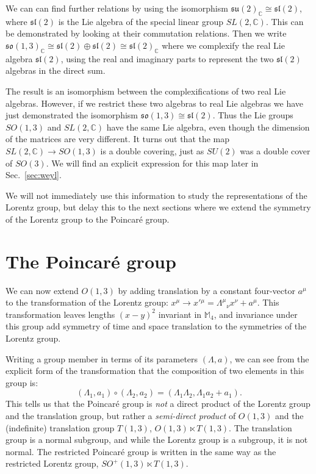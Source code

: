 \documentclass[notes.tex]{subfiles}
\begin{document}
We can can find further relations by using the isomorphism $\mathfrak{su}(2)_{\mathbb C}\cong \mathfrak{sl}(2)$, where $\mathfrak{sl}(2)$ is the Lie algebra of the special linear group $SL(2,\mathbb C)$. This can be demonstrated by looking at their commutation relations. Then we write
$\mathfrak{so}(1,3)_{\mathbb C}\cong \mathfrak{sl}(2)\oplus\mathfrak{sl}(2)\cong\mathfrak{sl}(2)_{\mathbb C}$ where we complexify the real Lie algebra $\mathfrak{sl}(2)$, using the real and imaginary parts to represent the two $\mathfrak{sl}(2)$ algebras in the direct sum.

The result is an isomorphism between the complexifications of two real Lie algebras. However, if we restrict these two algebras to real Lie algebras we have just demonstrated the isomorphism $\mathfrak{so}(1,3)\cong \mathfrak{sl}(2)$. Thus the Lie groups $SO(1,3)$ and $SL(2,\mathbb C)$ have the same Lie algebra, even though the dimension of the matrices are very different. It turns out that the map $SL(2,\mathbb C)\to SO(1,3)$ is a double covering, just as $SU(2)$ was a double cover of $SO(3)$. We will find an explicit expression for this map later in Sec.~\ref{sec:weyl}.

We will not immediately use this information to study the representations of the Lorentz group, but delay this to the next sections where we extend the symmetry of the Lorentz group to the Poincaré group. 


\section{The Poincaré group}
\label{sec:Poincare_group}
We can now extend $O(1,3)$ by adding translation by a constant four-vector $a^\mu$ to the transformation of the Lorentz group:  $x^\mu \to x'{}^\mu = \Lambda^\mu{}_\nu x^\nu + a^\mu$. This transformation leaves lengths $(x-y)^2$ invariant in $\mathbb{M}_4$, and invariance under this group add symmetry of time and space translation to the symmetries of the Lorentz group.

Writing a group member in terms of its parameters $(\Lambda, a)$, we can see  from the explicit form of the transformation that the composition of two elements in this group is:
\[(\Lambda_1, a_1)\circ(\Lambda_2, a_2) = (\Lambda_1\Lambda_2, \Lambda_1a_2 + a_1).\]
This tells us that the Poincar\'{e} group is {\it not} a direct product of the Lorentz group and the translation group, but rather a {\it semi-direct product} of $O(1,3)$ and the (indefinite) translation group $T(1,3)$, $O(1,3) \ltimes T(1,3)$. The translation group is a normal subgroup, and while the Lorentz group is a subgroup, it is not normal. The restricted Poincaré group is written in the same way as the restricted Lorentz group, $SO^+(1,3) \ltimes T(1,3)$.
\end{document}

